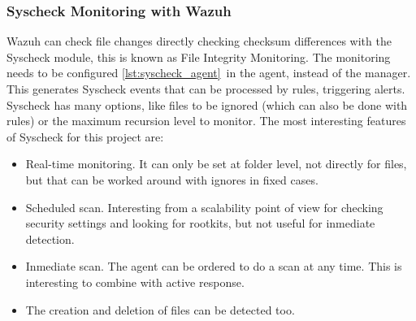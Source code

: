 \subsubsection{Syscheck Monitoring with Wazuh}
Wazuh can check file changes directly checking checksum differences with the Syscheck module, this is known as File Integrity Monitoring.
\linej
The monitoring needs to be configured \ref{lst:syscheck_agent}\ in the agent, instead of the manager.
This generates Syscheck events that can be processed by rules, triggering alerts.
Syscheck has many options, like files to be ignored (which can also be done with rules) or the maximum recursion level to monitor.
\linej
The most interesting features of Syscheck for this project are\cite{libro_ossec}:
\begin{itemize}
	\item Real-time monitoring. It can only be set at folder level, not directly for files, but that can be worked around with ignores in fixed cases.
	\item Scheduled scan. Interesting from a scalability point of view for checking security settings and looking for rootkits, but not useful for inmediate detection.
	\item Inmediate scan. The agent can be ordered to do a scan at any time. This is interesting to combine with active response.
	\item The creation and deletion of files can be detected too.
\end{itemize}

